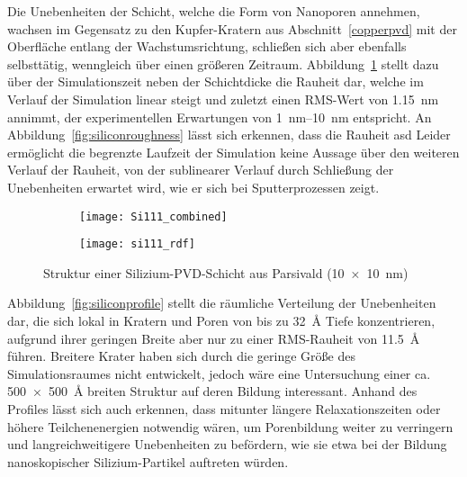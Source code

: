 Die Unebenheiten der Schicht, welche die Form von Nanoporen annehmen, wachsen im Gegensatz zu den Kupfer-Kratern aus Abschnitt~\ref{copperpvd} mit der Oberfläche entlang der Wachstumsrichtung, schließen sich aber ebenfalls selbsttätig, wenngleich über einen größeren Zeitraum.
Abbildung~\ref{fig:siliconresults-a} stellt dazu über der Simulationszeit neben der Schichtdicke die Rauheit dar, welche im Verlauf der Simulation linear steigt und zuletzt einen RMS-Wert von \SI{1.15}{\nano\meter} annimmt, der experimentellen Erwartungen von \SIrange{1}{10}{\nano\meter} entspricht\cite{gago_nanopatterning_2002}.
An Abbildung~\ref{fig:siliconroughness} lässt sich erkennen, dass die Rauheit asd
Leider ermöglicht die begrenzte Laufzeit der Simulation keine Aussage über den weiteren Verlauf der Rauheit, von der sublinearer Verlauf durch Schließung der Unebenheiten erwartet wird, wie er sich bei Sputterprozessen zeigt\cite{gago_nanopatterning_2002}.

\begin{figure}
  \captionsetup[subfigure]{singlelinecheck=false}
  \def\subfigwidth{0.48\textwidth}
  \begin{subfigure}[t]{\subfigwidth}
    \texttt{[image: Si111\_combined]}
    \label{fig:siliconresults-a}
  \end{subfigure}
  \hfill
  \begin{subfigure}[t]{\subfigwidth}
    \texttt{[image: si111\_rdf]}
    \label{fig:siliconresults-b}
  \end{subfigure}
  \caption[Struktur einer Silizium-PVD-Schicht aus Parsivald]{
    Struktur einer Silizium-PVD-Schicht aus Parsivald (\SI{10x10}{\nano\meter})
  }
  \label{fig:siliconresults}
\end{figure}

Abbildung~\ref{fig:siliconprofile} stellt die räumliche Verteilung der Unebenheiten dar, die sich lokal in Kratern und Poren von bis zu \SI{32}{\angstrom} Tiefe konzentrieren, aufgrund ihrer geringen Breite aber nur zu einer RMS-Rauheit von \SI{11.5}{\angstrom} führen.
Breitere Krater haben sich durch die geringe Größe des Simulationsraumes nicht entwickelt, jedoch wäre eine Untersuchung einer ca. \SI{500x500}{\angstrom} breiten Struktur auf deren Bildung interessant.
Anhand des Profiles lässt sich auch erkennen, dass mitunter längere Relaxationszeiten oder höhere Teilchenenergien notwendig wären, um Porenbildung weiter zu verringern und langreichweitigere Unebenheiten zu befördern, wie sie etwa bei der Bildung nanoskopischer Silizium-Partikel auftreten würden.

